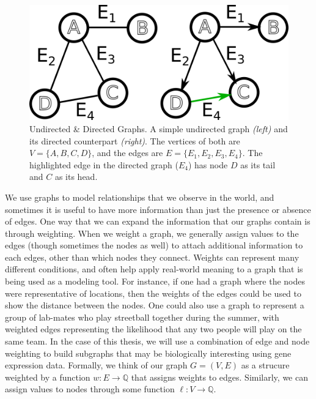 \documentclass[12pt,twoside]{reedthesis}
\theoremstyle{definition}
\begin{document}
  \begin{figure}[!h]
    \begin{center}
      \includegraphics[width=\textwidth/2]{simple_graph_du}
    \caption[Undirected \& Directed Graphs.]{Undirected \& Directed Graphs. A simple undirected graph \textit{(left)} and its directed counterpart \textit{(right)}. The vertices of both are $V=\{A,B,C,D\}$, and the edges are $E=\{E_1,E_2,E_3,E_4\}$. The highlighted edge in the directed graph ($E_4$) has node $D$ as its tail and $C$ as its head.}
    \label{fig:simple_graph_du}
    \end{center}
  \end{figure}

  We use graphs to model relationships that we observe in the world, and sometimes it is useful to have more information than just the presence or absence of edges. One way that we can expand the information that our graphs contain is through weighting. When we weight a graph, we generally assign values to the edges (though sometimes the nodes as well) to attach additional information to each edges, other than which nodes they connect. Weights can represent many different conditions, and often help apply real-world meaning to a graph that is being used as a modeling tool. For instance, if one had a graph where the nodes were representative of locations, then the weights of the edges could be used to show the distance between the nodes. One could also use a graph to represent a group of lab-mates who play streetball together during the summer, with weighted edges representing the likelihood that any two people will play on the same team. In the case of this thesis, we will use a combination of edge and node weighting to build subgraphs that may be biologically interesting using gene expression data. Formally, we think of our graph $G=(V,E)$ as a strucure weighted by a function $w:E \rightarrow \mathbb{Q}$ that assigns weights to edges. Similarly, we can assign values to nodes through some function $\ell:V \rightarrow \mathbb{Q}$.\par
\end{document}
